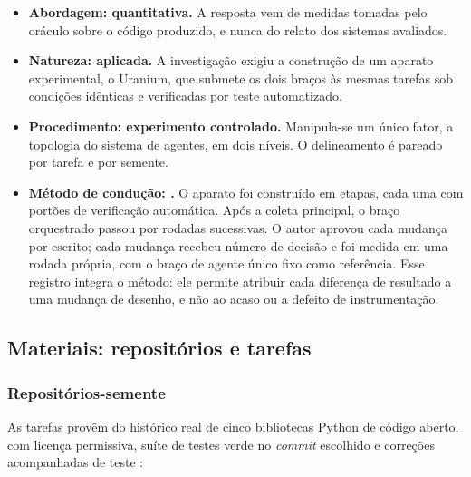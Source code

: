 \begin{itemize}
    \item \textbf{Abordagem: quantitativa.}  A resposta vem de medidas tomadas pelo oráculo sobre o código produzido, e nunca do relato dos sistemas avaliados.
    \item \textbf{Natureza: aplicada.} A investigação exigiu a construção de um aparato experimental, o Uranium, que submete os dois braços às mesmas tarefas sob condições idênticas e verificadas por teste automatizado.
    \item \textbf{Procedimento: experimento controlado.} Manipula-se um único fator, a topologia do sistema de agentes, em dois níveis. O delineamento é pareado por tarefa e por semente. 
    \item \textbf{Método de condução: .} O aparato foi construído em etapas, cada uma com portões de verificação automática. Após a coleta principal, o braço orquestrado passou por rodadas sucessivas. O autor aprovou cada mudança por escrito; cada mudança recebeu número de decisão e foi medida em uma rodada própria, com o braço de agente único fixo como referência.  Esse registro integra o método: ele permite atribuir cada diferença de resultado a uma mudança de desenho, e não ao acaso ou a defeito de instrumentação.
\end{itemize}

\subsection{Materiais: repositórios e tarefas}
\label{ssec:materiais}

\subsubsection{Repositórios-semente}

As tarefas provêm do histórico real de cinco bibliotecas Python de código aberto, com licença permissiva, suíte de testes verde no \textit{commit} escolhido e correções acompanhadas de teste :

